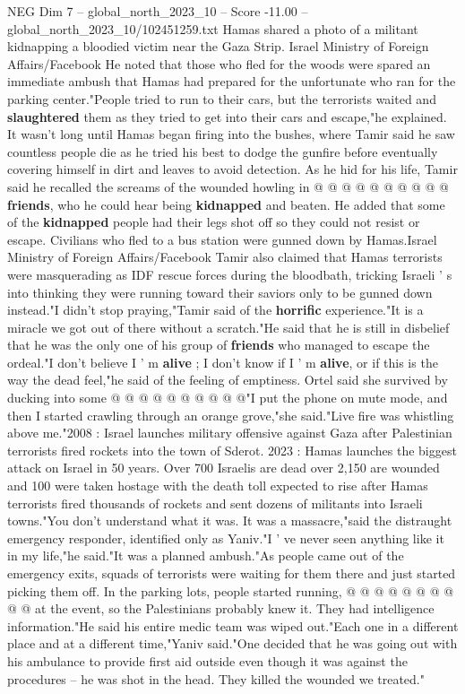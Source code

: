 \begin{textsample}{NEG Dim 7 – global\_north\_2023\_10 – Score -11.00 – global\_north\_2023\_10/102451259.txt}
Hamas shared a photo of a militant kidnapping a bloodied victim near the Gaza Strip.
Israel Ministry of Foreign Affairs/Facebook He noted that those who fled for the woods were spared an immediate ambush that Hamas had prepared for the unfortunate who ran for the parking center."People tried to run to their cars, but the terrorists waited and \textbf{slaughtered} them as they tried to get into their cars and escape,"he explained.
It wasn't long until Hamas began firing into the bushes, where Tamir said he saw countless people die as he tried his best to dodge the gunfire before eventually covering himself in dirt and leaves to avoid detection.
As he hid for his life, Tamir said he recalled the screams of the wounded howling in @ @ @ @ @ @ @ @ @ @ \textbf{friends}, who he could hear being \textbf{kidnapped} and beaten.
He added that some of the \textbf{kidnapped} people had their legs shot off so they could not resist or escape.
Civilians who fled to a bus station were gunned down by Hamas.Israel Ministry of Foreign Affairs/Facebook Tamir also claimed that Hamas terrorists were masquerading as IDF rescue forces during the bloodbath, tricking Israeli ' s into thinking they were running toward their saviors only to be gunned down instead."I didn't stop praying,"Tamir said of the \textbf{horrific} experience."It is a miracle we got out of there without a scratch."He said that he is still in disbelief that he was the only one of his group of \textbf{friends} who managed to escape the ordeal."I don't believe I ' m \textbf{alive} ; I don't know if I ' m \textbf{alive}, or if this is the way the dead feel,"he said of the feeling of emptiness.
Ortel said she survived by ducking into some @ @ @ @ @ @ @ @ @ @"I put the phone on mute mode, and then I started crawling through an orange grove,"she said."Live fire was whistling above me."2008 : Israel launches military offensive against Gaza after Palestinian terrorists fired rockets into the town of Sderot. 2023 : Hamas launches the biggest attack on Israel in 50 years.
Over 700 Israelis are dead over 2,150 are wounded and 100 were taken hostage with the death toll expected to rise after Hamas terrorists fired thousands of rockets and sent dozens of militants into Israeli towns."You don't understand what it was.
It was a massacre,"said the distraught emergency responder, identified only as Yaniv."I ' ve never seen anything like it in my life,"he said."It was a planned ambush."As people came out of the emergency exits, squads of terrorists were waiting for them there and just started picking them off.
In the parking lots, people started running, @ @ @ @ @ @ @ @ @ @ at the event, so the Palestinians probably knew it.
They had intelligence information."He said his entire medic team was wiped out."Each one in a different place and at a different time,"Yaniv said."One decided that he was going out with his ambulance to provide first aid outside even though it was against the procedures -- he was shot in the head.
They killed the wounded we treated."

\end{textsample}
